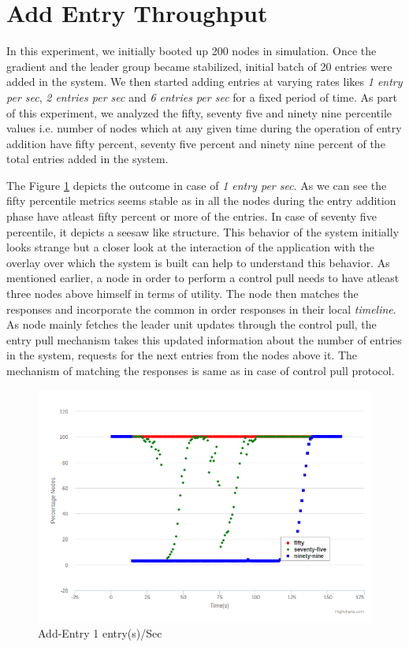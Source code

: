 \documentclass[12pt,a4paper,twoside,openright]{book}
\begin{document}
\section{Add Entry Throughput}

In this experiment, we initially booted up 200 nodes in simulation. Once the gradient and the leader group became stabilized, initial batch of 20 entries were added in the system. We then started adding entries at varying rates likes \textit{1 entry per sec}, \textit{2 entries per sec} and  \textit{6 entries per sec} for a fixed period of time. As part of this experiment, we analyzed the fifty, seventy five and ninety nine percentile values i.e. number of nodes which at any given time during the operation of entry addition have fifty percent, seventy five percent and ninety nine percent of the total entries added in the system. 

\par The Figure \ref{fig:addEntry1} depicts the outcome in case of \textit{1 entry per sec}. As we can see the fifty percentile metrics seems stable as in all the nodes during the entry addition phase have atleast fifty percent or more of the entries. In case of seventy five percentile, it depicts a seesaw like structure. This behavior of the system initially looks strange but a closer look at the interaction of the application with the overlay over which the system is built can help to understand this behavior. As mentioned earlier, a node in order to perform a control pull needs to have atleast three nodes above himself in terms of utility. The node then matches the responses and incorporate the common in order responses in their local \textit{timeline}. As node mainly fetches the leader unit updates through the control pull, the entry pull mechanism takes this updated information about the number of entries in the system, requests for the next entries from the nodes above it. The mechanism of matching the responses is same as in case of control pull protocol. 

\begin{figure}[h]
	\includegraphics[scale=0.5]{200-1EntryPerSec}
	\caption{Add-Entry 1 entry(s)/Sec}
	\label{fig:addEntry1}
\end{figure}
\end{document}
